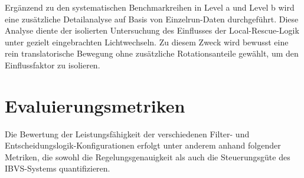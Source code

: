 Ergänzend zu den systematischen Benchmarkreihen in Level a und Level b wird eine zusätzliche Detailanalyse auf Basis von Einzelrun-Daten durchgeführt. Diese Analyse diente der isolierten Untersuchung des Einflusses der Local-Rescue-Logik unter gezielt eingebrachten Lichtwechseln. Zu diesem Zweck wird bewusst eine rein translatorische Bewegung ohne zusätzliche Rotationsanteile gewählt, um den Einflussfaktor zu isolieren.


\section{Evaluierungsmetriken}
\label{subsec:evaluierungsmetriken}
Die Bewertung der Leistungsfähigkeit der verschiedenen Filter- und Entscheidungslogik-Konfigurationen erfolgt unter anderem anhand folgender Metriken, die sowohl die Regelungsgenauigkeit als auch die Steuerungsgüte des \ac{IBVS}-Systems quantifizieren.
